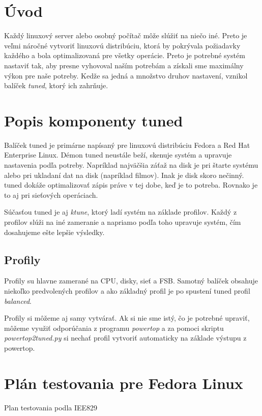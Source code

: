 %
%

\chapter{Úvod}
Každý linuxový server alebo osobný počítač môže slúžiť na niečo iné. Preto je
veľmi náročné vytvoriť linuxovú distribúciu, ktorá by pokrývala požiadavky
každého a bola optimalizovaná pre všetky operácie. Preto je potrebné systém
nastaviť tak, aby presne vyhovoval naším potrebám a získali sme maximálny výkon
pre naše potreby. Kedže sa jedná a množstvo druhov nastavení, vznikol balíček
\emph{tuned}\cite{tunedHomepage}, ktorý ich zahrňuje.

%
%

\chapter{Popis komponenty tuned}
Balíček tuned je primárne napísaný pre linuxovú distribúciu
Fedora\cite{fedoraHomepage} a Red Hat Enterprise Linux. Démon tuned neustále
beží, skenuje systém a upravuje nastavenia podľa potreby. Napríklad najväčšia
záťaž na disk je pri štarte systému alebo pri ukladaní dat na disk (napríklad
filmov). Inak je disk skoro nečinný. tuned dokáže optimalizovať zápis práve v
tej dobe, keď je to potreba. Rovnako je to aj pri sieťových operáciach.

Súčasťou tuned je aj \emph{ktune}, ktorý ladí systém na základe profilov. Každý
z profilov slúži na iné zameranie a napriamo podľa toho upravuje systém, čím
dosahujeme ešte lepšie výsledky.

\section{Profily}
Profily su hlavne zamerané na CPU, disky, sieť a FSB. Samotný balíček obsahuje
niekoľko predvolených profilov a ako základný profil je po spustení tuned
profil \emph{balanced}.

Profily si môžeme aj samy vytvárať. Ak si nie sme istý, čo je potrebné upraviť,
môžeme využiť odporúčania z programu \emph{powertop}\cite{powertopHomepage} a
za pomoci skriptu \emph{powertop2tuned.py} si nechať profil vytvoriť
automaticky na základe výstupu z powertop. 

%
%

\chapter{Plán testovania pre Fedora Linux}
Plan testovania podla IEE829

